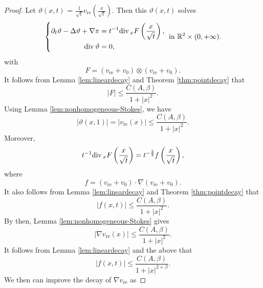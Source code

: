 \documentclass[12pt]{amsart}
\renewcommand{\div}{{\rm div \thinspace }}
\numberwithin{equation}{section}              %
\theoremstyle{remark}
\begin{document}
		\begin{proof}
			Let $\vartheta(x,t)$ = $\frac{1}{\sqrt{t}}v_{\textrm{re}}\left(\frac{x}{\sqrt{t}}\right)$. Then this
			$\vartheta(x,t)$ solves
			\begin{equation}	\label{eq:nonhomogeneous-Stokes1}
				\left\{
				\begin{aligned}
					\partial_t \vartheta - \Delta \vartheta + \nabla \pi &= t^{-1}\div_x F\left(\frac{x}{\sqrt{t}}\right), \\
					\div \vartheta &= 0,
				\end{aligned}
				\right. \text{ in } \mathbb{R}^2 \times (0, +\infty).
			\end{equation}
			with 
			\begin{equation*}
				F= (v_{\textrm{re}} + v_0)\otimes(v_{\textrm{re}} + v_0).
			\end{equation*}
			It follows from Lemma \ref{lem:lineardecay} and Theorem \ref{thm:pointdecay} that
			\begin{equation*}
				|F|\leq \frac{C(A,\beta)}{1+|x|^2}.
			\end{equation*}
			Using Lemma \ref{lem:nonhomogeneous-Stokes}, we have
			\begin{equation*}
				|\vartheta(x,1)|= |v_{\textrm{re}}(x)|\leq \frac{C(A,\beta)}{1+|x|^2}.
			\end{equation*}
			Moreover, 
			\begin{equation*}
				t^{-1}\div_x F\left(\frac{x}{\sqrt{t}}\right) = t^{-\frac{3}{2}}f\left(\frac{x}{\sqrt{t}}\right),
			\end{equation*}
			where
			\begin{equation*}
				f= (v_{\textrm{re}} + v_0)\cdot \nabla (v_{\textrm{re}} + v_0).
			\end{equation*}
			It also follows from Lemma \ref{lem:lineardecay} and Theorem \ref{thm:pointdecay} that
			\begin{equation*}
				|f(x, t)|\leq \frac{C(A,\beta)}{1+|x|^2}.
			\end{equation*}
			By then, Lemma \ref{lem:nonhomogeneous-Stokes} gives
			\begin{equation*}
				|\nabla v_{\textrm{re}}(x)|\leq \frac{C(A,\beta)}{1+|x|^2}.
			\end{equation*}
            It follows from Lemma \ref{lem:lineardecay} and the above that
            \begin{equation*}
				|f(x, t)|\leq \frac{C(A,\beta)}{1+|x|^{2+\beta}}.
			\end{equation*}
			We then can improve the decay of  $\nabla v_{\textrm{re}}$ as 

\end{proof}
\end{document}
